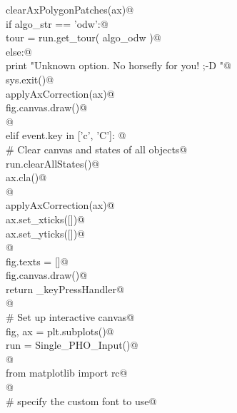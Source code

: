 \documentclass[12.0pt]{report}
\begin{document}
\begin{flushleft}
\begin{list}{}{}
\mbox{}\verb@                    clearAxPolygonPatches(ax)@\\
\mbox{}\verb@                    if   algo_str == 'odw':@\\
\mbox{}\verb@                          tour = run.get_tour( algo_odw )@\\
\mbox{}\verb@                    else:@\\
\mbox{}\verb@                          print "Unknown option. No horsefly for you! ;-D "@\\
\mbox{}\verb@                          sys.exit()@\\
\mbox{}\verb@                    applyAxCorrection(ax)@\\
\mbox{}\verb@                    fig.canvas.draw()@\\
\mbox{}\verb@                    @\\
\mbox{}\verb@               elif event.key in ['c', 'C']: @\\
\mbox{}\verb@                    # Clear canvas and states of all objects@\\
\mbox{}\verb@                    run.clearAllStates()@\\
\mbox{}\verb@                    ax.cla()@\\
\mbox{}\verb@                                  @\\
\mbox{}\verb@                    applyAxCorrection(ax)@\\
\mbox{}\verb@                    ax.set_xticks([])@\\
\mbox{}\verb@                    ax.set_yticks([])@\\
\mbox{}\verb@                                     @\\
\mbox{}\verb@                    fig.texts = []@\\
\mbox{}\verb@                    fig.canvas.draw()@\\
\mbox{}\verb@           return _keyPressHandler@\\
\mbox{}\verb@    @\\
\mbox{}\verb@    # Set up interactive canvas@\\
\mbox{}\verb@    fig, ax =  plt.subplots()@\\
\mbox{}\verb@    run = Single_PHO_Input()@\\
\mbox{}\verb@        @\\
\mbox{}\verb@    from matplotlib import rc@\\
\mbox{}\verb@    @\\
\mbox{}\verb@    # specify the custom font to use@\\

\end{list}
\end{flushleft}
\end{document}
